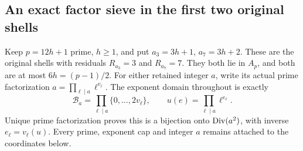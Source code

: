 \subsection{An exact factor sieve in the first two original shells}

Keep \(p=12h+1\) prime, \(h\ge1\), and put
\(a_3=3h+1\), \(a_7=3h+2\). These are the original shells
with residuals \(R_{a_3}=3\) and \(R_{a_7}=7\).
They both lie in \(A_p\), and both are at most \(6h=(p-1)/2\).
For either retained integer \(a\), write its actual prime factorization
\(a=\prod_{\ell\mid a}\ell^{v_\ell}\). The exponent domain throughout
is exactly
\[
 \mathcal B_a=\prod_{\ell\mid a}\{0,\ldots,2v_\ell\},\qquad
 u(e)=\prod_{\ell\mid a}\ell^{e_\ell}.
\]
Unique prime factorization proves this is a bijection onto \(\operatorname{Div}(a^2)\),
with inverse \(e_\ell=v_\ell(u)\). Every prime, exponent cap and
integer \(a\) remains attached to the coordinates below.

